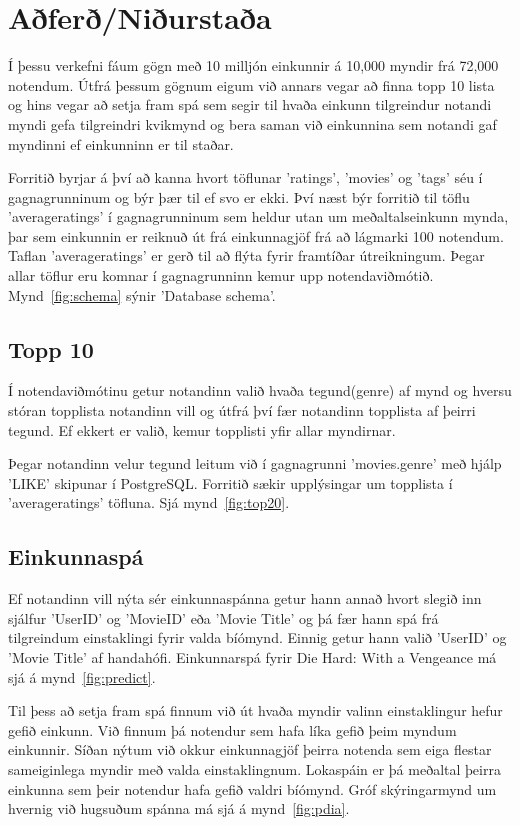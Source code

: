 \documentclass[11pt,a4paper]{amsart}
\theoremstyle{plain}
\theoremstyle{definition}
\theoremstyle{remark}
\begin{document}


\section{Aðferð/Niðurstaða}
Í þessu verkefni fáum gögn með 10 milljón einkunnir á 10,000 myndir frá 72,000 notendum.
Útfrá þessum gögnum eigum við annars vegar að finna topp 10 lista og hins vegar að setja fram spá sem segir til hvaða einkunn tilgreindur notandi myndi gefa tilgreindri kvikmynd og bera saman við einkunnina sem notandi gaf myndinni ef einkunninn er til staðar.  
\\\par
Forritið byrjar á því að kanna hvort töflunar 'ratings', 'movies' og 'tags' séu í gagnagrunninum og býr þær til ef svo er ekki. Því næst býr forritið til töflu 'averageratings' í gagnagrunninum sem heldur utan um meðaltalseinkunn mynda, þar sem einkunnin er reiknuð út frá einkunnagjöf frá að lágmarki 100 notendum. Taflan 'averageratings' er gerð til að flýta fyrir framtíðar útreikningum. Þegar allar töflur eru komnar í gagnagrunninn kemur upp notendaviðmótið. Mynd~\ref{fig:schema} sýnir 'Database schema'.

\subsection{Topp 10}
Í notendaviðmótinu getur notandinn valið hvaða tegund(genre) af mynd og hversu stóran topplista notandinn vill og útfrá því fær notandinn topplista af þeirri tegund. Ef ekkert er valið, kemur topplisti yfir allar myndirnar.\par Þegar notandinn velur tegund leitum við í gagnagrunni 'movies.genre' með hjálp 'LIKE' skipunar í PostgreSQL. Forritið sækir upplýsingar um topplista í 'averageratings' töfluna. Sjá mynd~\ref{fig:top20}.

\subsection{Einkunnaspá}
Ef notandinn vill nýta sér einkunnaspánna getur hann annað hvort slegið inn sjálfur 'UserID' og 'MovieID' eða 'Movie Title' og þá fær hann spá frá tilgreindum einstaklingi fyrir valda bíómynd. Einnig getur hann valið 'UserID' og 'Movie Title' af handahófi. Einkunnarspá fyrir Die Hard: With a Vengeance má sjá á mynd~\ref{fig:predict}.\par
Til þess að setja fram spá finnum við út hvaða myndir valinn einstaklingur hefur gefið einkunn. Við finnum þá notendur sem hafa líka gefið þeim myndum einkunnir. Síðan nýtum við okkur einkunnagjöf þeirra notenda sem eiga flestar sameiginlega myndir með valda einstaklingnum. Lokaspáin er þá meðaltal þeirra einkunna sem þeir notendur hafa gefið valdri bíómynd. Gróf skýringarmynd um hvernig við hugsuðum spánna má sjá á mynd~\ref{fig:pdia}.
\end{document}
